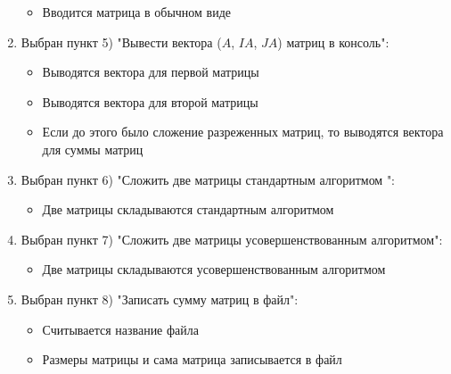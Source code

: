 \begin{enumerate}
	\begin{itemize}
		\item Вводится матрица в обычном виде
	\end{itemize}
	\item Выбран пункт 5) "Вывести вектора ($A$, $IA$, $JA$) матриц в консоль":
	\begin{itemize}
		\item Выводятся вектора для первой матрицы
		\item Выводятся вектора для второй матрицы
		\item Если до этого было сложение разреженных матриц, то выводятся вектора для суммы матриц
	\end{itemize}
	\item Выбран пункт 6) "Сложить две матрицы стандартным алгоритмом ":
	\begin{itemize}
		\item Две матрицы складываются стандартным алгоритмом 
	\end{itemize}
	\item Выбран пункт 7) "Сложить две матрицы усовершенствованным алгоритмом":
	\begin{itemize}
		\item Две матрицы складываются усовершенствованным алгоритмом 
	\end{itemize}
	\item Выбран пункт 8) "Записать сумму матриц в файл":
	\begin{itemize}
		\item Считывается название файла
		\item Размеры матрицы и сама матрица записывается в файл
	\end{itemize}
\end{enumerate}

\vspace{2em}
